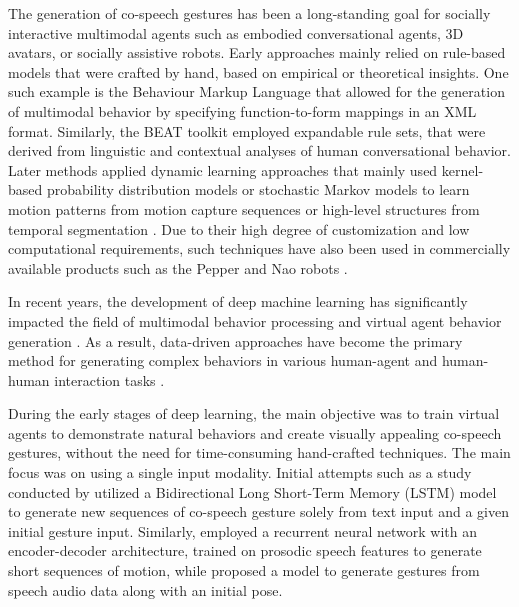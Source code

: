 \documentclass[sigconf]{acmart}
\begin{document}
The generation of co-speech gestures has been a long-standing goal for socially interactive multimodal agents such as embodied conversational agents, 3D avatars, or socially assistive robots. Early approaches mainly relied on rule-based models that were crafted by hand, based on empirical or theoretical insights. One such example is the Behaviour Markup Language \cite{koppCommonFrameworkMultimodal2006a} that allowed for the generation of multimodal behavior by specifying function-to-form mappings in an XML format. Similarly, the BEAT toolkit \cite{cassellBEATBehaviorExpression2004} employed expandable rule sets, that were derived from linguistic and contextual analyses of human conversational behavior. Later methods applied dynamic learning approaches that mainly used kernel-based probability distribution models or stochastic Markov models to learn motion patterns from motion capture sequences or high-level structures from temporal segmentation \cite{brandStyleMachines2000a,galataLearningVariableLengthMarkov2001}. Due to their high degree of customization and low computational requirements, such techniques have also been used in commercially available products such as the Pepper and Nao robots \cite{pandeyMassProducedSociableHumanoid2018}.

In recent years, the development of deep machine learning has significantly impacted the field of multimodal behavior processing and virtual agent behavior generation \cite{changchunliuEmpiricalStudyMachine2005, kimPororobotDeepLearning}. As a result, data-driven approaches have become the primary method for generating complex behaviors in various human-agent and human-human interaction tasks \cite{yuInteractiveRobotLearning2019a, tapusPerceivingPersonTheir2019a}.

During the early stages of deep learning, the main objective was to train virtual agents to demonstrate natural behaviors and create visually appealing co-speech gestures, without the need for time-consuming hand-crafted techniques. The main focus was on using a single input modality. Initial attempts such as a study conducted by \citet{fanTTSSynthesisBidirectional2014a} utilized a Bidirectional Long Short-Term Memory (LSTM) model to generate new sequences of co-speech gesture solely from text input and a given initial gesture input. Similarly, \citet{ferstlInvestigatingUseRecurrent2018a} employed a recurrent neural network with an encoder-decoder architecture, trained on prosodic speech features to generate short sequences of motion, while  \citet{ginosarLearningIndividualStyles2019a} proposed a model to generate gestures from speech audio data along with an initial pose.
\end{document}

